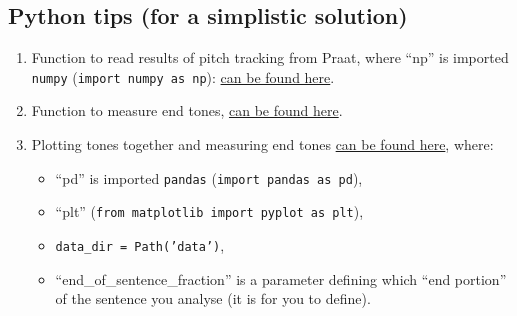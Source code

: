\documentclass{../labbook}
\begin{document}
\subsection*{Python tips (for a simplistic solution)}
\begin{enumerate}
    \item Function to read results of pitch tracking from Praat, where ``np'' is imported \texttt{numpy} (\texttt{import numpy as np}): \href{https://gist.github.com/vassverk/b005b5638563b53797624e511a25fb7a}{can be found here}.
    \item Function to measure end tones,  \href{https://gist.github.com/vassverk/b53ae5827b6f4ae9fe41d353a74a9aae}{can be found here}.
    \item Plotting tones together and measuring end tones \href{https://gist.github.com/vassverk/68afaa710d6233695feda2a67612416a}{can be found here}, where:
\begin{itemize}
    \item ``pd'' is imported \texttt{pandas} (\texttt{import pandas as pd}),
    \item ``plt'' (\texttt{from matplotlib import pyplot as plt}),
    \item \texttt{data\_dir = Path('data')},
    \item ``end\_of\_sentence\_fraction'' is a parameter defining which ``end portion'' of the sentence you analyse (it is for you to define).
\end{itemize}
\end{enumerate}

 
\end{document}
